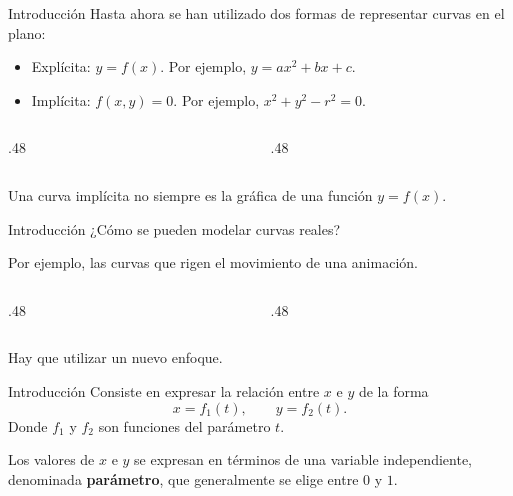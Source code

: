 \documentclass[main.tex]{subfiles}
\begin{document}
\graphicspath{{imagenes/tema11/}{../imagenes/tema11/}}


\begin{frame}[t]{Introducción}
Hasta ahora se han utilizado dos formas de representar curvas en el plano:\begin{itemize}
\item Explícita: $y=f(x)$. Por ejemplo, $y=ax^2+bx+c$.
\item Implícita: $f(x,y)=0$. Por ejemplo, $x^2+y^2-r^2=0$.
\end{itemize}\begin{columns}[T]\begin{column}{.48\textwidth}\end{column}\begin{column}{.48\textwidth}\end{column}\end{columns}Una curva implícita no siempre es la gráfica de una función $y=f(x)$.
\end{frame}

\begin{frame}[t]{Introducción}
¿Cómo se pueden modelar curvas reales?\par\medskip Por ejemplo, las curvas que rigen el movimiento de una animación.\begin{columns}[T]\begin{column}{.48\textwidth}\end{column}\begin{column}{.48\textwidth}\end{column}\end{columns}\begin{center}\large Hay que utilizar un nuevo enfoque.\end{center}
\end{frame}

\begin{frame}[t]{Introducción}
Consiste en expresar la relación entre $x$ e $y$ de la forma\[x=f_1(t),\qquad y=f_2(t).\]Donde $f_1$ y $f_2$ son funciones del parámetro $t$.\par\bigskip Los valores de $x$ e $y$ se expresan en términos de una variable independiente, denominada \textbf{parámetro}, que generalmente se elige entre $0$ y $1$.
\end{frame}
\end{document}

